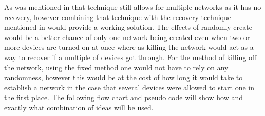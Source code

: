 \bigskip \noindent
As was mentioned in  that technique still allows for multiple networks as it has no recovery, however combining that technique with the recovery technique mentioned in  would provide a working solution.
The effects of randomly create would be a better chance of only one network being created even when two or more devices are turned on at once where as killing the network would act as a way to recover if a multiple of devices got through.
For the method of killing off the network, using the fixed method one would not have to rely on any randomness, however this would be at the cost of how long it would take to establish a network in the case that several devices were allowed to start one in the first place.
The following flow chart and pseudo code will show how and exactly what combination of ideas will be used.


